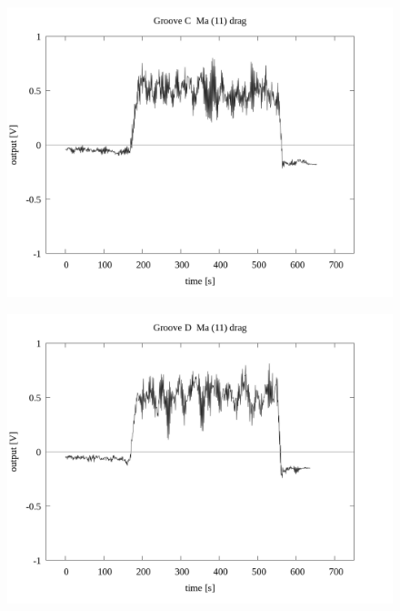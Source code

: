 \documentclass[a4paper]{jsarticle}
\begin{document}
\begin{figure}[htbp]
    \footnotesize
    \begin{center}
        \includegraphics[width=140mm]{../../../33_result/210806/moving_average/11/drag/01/Groove_C_ma(11)_drag_01.png}
    \end{center}
\end{figure}

\begin{figure}[htbp]
    \footnotesize
    \begin{center}
        \includegraphics[width=140mm]{../../../33_result/210806/moving_average/11/drag/01/Groove_D_ma(11)_drag_01.png}
    \end{center}
\end{figure}
\end{document}
